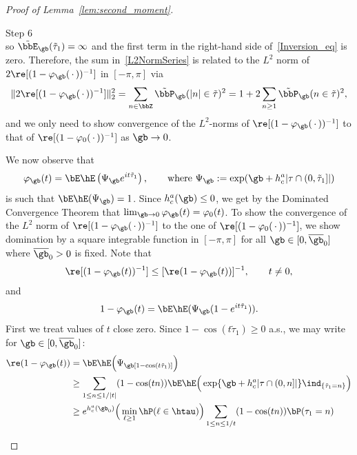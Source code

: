 \begin{proof}[Proof of Lemma~\ref{lem:second_moment}]
\begin{laststep}{Step 6}
\begin{equation}
\end{equation}
so $\tilde \bbE_\gb(\tilde\tau_1) = \infty$ and the first term in the right-hand side of~\eqref{Inversion_eq} is zero. Therefore, the sum in~\eqref{L2NormSeries} is related to the $L^2$ norm of $2 \re[(1 - \varphi_\gb({\,\cdot\,}))^{-1}]$ in $[- \pi,\pi]$ via
\begin{equation}
\| 2 \re[(1 - \varphi_\gb({\,\cdot\,}))^{-1}] \|_2^2 = \sum_{n\in\bbZ} \tilde \bbP_\gb(|n| \in \tilde\tau)^2 = 1 + 2 \sum_{n\geq1} \tilde\bbP_\gb(n \in \tilde\tau)^2,
\end{equation}
and we only need to show convergence of the $L^2$-norms of $\re[(1 - \varphi_\gb({\,\cdot\,}))^{-1}]$ to that of $\re[(1 - \varphi_0({\,\cdot\,}))^{-1}]$ as $\gb \to 0$.

We now observe that
\begin{equation}
\varphi_\gb(t) = \bE \hE \left(\Psi_\gb e^{i t \tilde\tau_1} \right), \qquad \text{where } \Psi_\gb := \exp(\gb + h_c^a |\tau \cap (0,\tilde\tau_1]|)
\end{equation}
is such that $\bE\hE(\Psi_\gb) = 1$. Since $h_c^a(\gb) \leq 0$, we get by the Dominated Convergence Theorem that $\lim_{\gb\to0} \varphi_\gb(t) = \varphi_0(t)$.\pagebreak{} To show the convergence of the $L^2$ norm of $\re[(1 - \varphi_\gb({\,\cdot\,}))^{-1}]$ to the one of $\re[(1 - \varphi_0({\,\cdot\,}))^{-1}]$, we show domination by a square integrable function in $[- \pi,\pi]$ for all $\gb \in [0,\overline\gb_0]$ where $\overline\gb_0 > 0$ is fixed. Note that
\begin{equation}
\re[(1 - \varphi_\gb(t))^{-1}] \leq [\re(1 - \varphi_\gb(t))]^{-1}, \qquad t \neq 0,
\end{equation}
and
\begin{equation}
1 - \varphi_\gb(t) = \bE \hE (\Psi_\gb (1 - e^{i t \tilde\tau_1})).
\end{equation}
First we treat values of $t$ close zero. Since $1 - \cos(t \tilde\tau_1) \geq 0$ a.s., we may write for $\gb \in [0,\overline\gb_0]$:
\begin{equation}
\begin{aligned}
\re(1 - \varphi_\gb(t)) &= \bE \hE \Big(\Psi_\gb [1 - \cos(t \tilde\tau_1)] \Big)\\
&\geq \sum_{1\leq n\leq 1/|t|} (1 - \cos(t n)) \bE \hE \Big(\exp\{\gb + h_c^a |\tau \cap (0,n]|\} \ind_{\{\tilde\tau_1 = n\}} \Big)\\
&\geq e^{h_c^a(\gb_0)} \Big(\min_{\ell\geq1} \hP(\ell \in \htau) \Big) \sum_{1\leq n\leq 1/t} (1 - \cos(t n)) \bP(\tau_1 = n)\\

\end{aligned}
\end{equation}
\end{laststep}
\end{proof}
